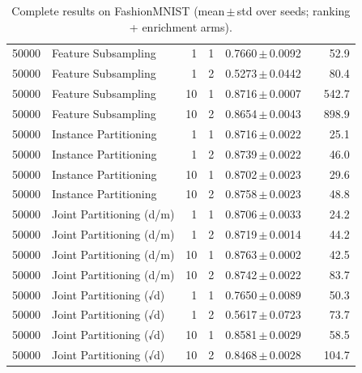 \begin{table}[ht]
\begin{tabular}{rlrrccr}
50000 & Feature Subsampling & 1 & 1 & 0.7660\,$\pm$\,0.0092 &  & 52.9 \\
50000 & Feature Subsampling & 1 & 2 & 0.5273\,$\pm$\,0.0442 &  & 80.4 \\
50000 & Feature Subsampling & 10 & 1 & 0.8716\,$\pm$\,0.0007 &  & 542.7 \\
50000 & Feature Subsampling & 10 & 2 & 0.8654\,$\pm$\,0.0043 &  & 898.9 \\
50000 & Instance Partitioning & 1 & 1 & 0.8716\,$\pm$\,0.0022 &  & 25.1 \\
50000 & Instance Partitioning & 1 & 2 & 0.8739\,$\pm$\,0.0022 &  & 46.0 \\
50000 & Instance Partitioning & 10 & 1 & 0.8702\,$\pm$\,0.0023 &  & 29.6 \\
50000 & Instance Partitioning & 10 & 2 & 0.8758\,$\pm$\,0.0023 &  & 48.8 \\
50000 & Joint Partitioning (d/m) & 1 & 1 & 0.8706\,$\pm$\,0.0033 &  & 24.2 \\
50000 & Joint Partitioning (d/m) & 1 & 2 & 0.8719\,$\pm$\,0.0014 &  & 44.2 \\
50000 & Joint Partitioning (d/m) & 10 & 1 & 0.8763\,$\pm$\,0.0002 &  & 42.5 \\
50000 & Joint Partitioning (d/m) & 10 & 2 & 0.8742\,$\pm$\,0.0022 &  & 83.7 \\
50000 & Joint Partitioning (√d) & 1 & 1 & 0.7650\,$\pm$\,0.0089 &  & 50.3 \\
50000 & Joint Partitioning (√d) & 1 & 2 & 0.5617\,$\pm$\,0.0723 &  & 73.7 \\
50000 & Joint Partitioning (√d) & 10 & 1 & 0.8581\,$\pm$\,0.0029 &  & 58.5 \\
50000 & Joint Partitioning (√d) & 10 & 2 & 0.8468\,$\pm$\,0.0028 &  & 104.7 \\
\bottomrule
\end{tabular}
\caption{Complete results on FashionMNIST (mean\,$\pm$\,std over seeds; ranking + enrichment arms).}
\label{tab:app_fashionmnist}
\end{table}
